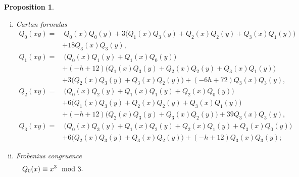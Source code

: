 \documentclass{gtpart}
\newtheorem{prop}[thm]{Proposition}
\theoremstyle{definition}
\theoremstyle{remark}
\newcommand{\md}{~~{\rm mod}~}
\begin{document}
\begin{prop}
\begin{enumerate}[(i)]
  \item {\em Cartan formulas} 
  \begin{equation*}
  \begin{split}
   Q_0(xy) = & ~ Q_0(x) Q_0(y) + 3 \big(Q_1(x) Q_3(y) + Q_2(x) Q_2(y) + Q_3(x) Q_1(y)\big) \\
             & + 18 Q_3(x) Q_3(y), \\
   Q_1(xy) = & ~ \big(Q_0(x) Q_1(y) + Q_1(x) Q_0(y)\big) \\
             & + (-h + 12) \big(Q_1(x) Q_3(y) + Q_2(x) Q_2(y) + Q_3(x) Q_1(y)\big) \\
             & + 3 \big(Q_2(x) Q_3(y) + Q_3(x) Q_2(y)\big) + (-6h + 72) Q_3(x) Q_3(y), \\
   Q_2(xy) = & ~ \big(Q_0(x) Q_2(y) + Q_1(x) Q_1(y) + Q_2(x) Q_0(y)\big) \\
             & + 6 \big(Q_1(x) Q_3(y) + Q_2(x) Q_2(y) + Q_3(x) Q_1(y)\big) \\
             & + (-h + 12) \big(Q_2(x) Q_3(y) + Q_3(x) Q_2(y)\big) + 39 Q_3(x) Q_3(y), \\
   Q_3(xy) = & ~ \big(Q_0(x) Q_3(y) + Q_1(x) Q_2(y) + Q_2(x) Q_1(y) + Q_3(x) Q_0(y)\big) \qquad \qquad \qquad \\
             & + 6 \big(Q_2(x) Q_3(y) + Q_3(x) Q_2(y)\big) + (-h + 12) Q_3(x) Q_3(y); 
  \end{split}
  \end{equation*}

  \item {\em Frobenius congruence} 
  \begin{equation*}
   Q_0(x) \equiv x^3 \md 3.  \qquad \qquad \qquad \qquad \qquad \qquad \qquad \qquad \qquad \qquad \qquad \qquad 
  \end{equation*}
 \end{enumerate}
\end{prop}
\end{document}
